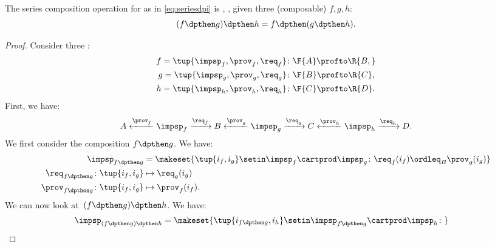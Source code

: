 \begin{lemma}
    \label{lem:dpi-series}
    The series composition operation for  as in \cref{eq:seriesdpi} is , \ie, given three (composable)  $f,g,h$:
    \begin{equation}
        (f\dpthen g)
        \dpthen h = f\dpthen (g\dpthen h).
    \end{equation}
\end{lemma}
\begin{proof}
    Consider three :
    \begin{equation}
        \begin{aligned}
            f=\tup{{\impsp_f, \prov_f, \req_f} } & \colon \F{A} \profto\R{B,} \\
            g=\tup{\impsp_g, \prov_g, \req_g}    & \colon \F{B} \profto \R{C}, \\
            h=\tup{\impsp_h, \prov_h, \req_h}    & \colon \F{C} \profto \R{D}.
        \end{aligned}
    \end{equation}
    First, we have:
    \begin{equation}
        A \xleftarrow{\prov_f} \impsp_f \xrightarrow{\req_f} B
        \xleftarrow{\prov_g} \impsp_g \xrightarrow{\req_g} C
        \xleftarrow{\prov_h} \impsp_h \xrightarrow{\req_h} D.
    \end{equation}
    We first consider the composition $f\dpthen g$.
    We have:
    \begin{equation}
        \begin{aligned}
            \impsp_{f\dpthen g}                     & = \makeset{
                \tup{i_f,i_g} \setin \impsp_f \cartprod \impsp_g \colon
                \req_f(i_f) \ordleq_{B} \prov_g(i_g)
            } \\
            \req_{f\dpthen g} \colon \tup{i_f,i_g}  & \mapsto \req_g(i_g) \\
            \prov_{f\dpthen g} \colon \tup{i_f,i_g} & \mapsto \prov_f(i_f).
        \end{aligned}
    \end{equation}
    We can now look at~$(f\dpthen g)\dpthen h$.
    We have:
    \begin{equation}
        \begin{aligned}
             & \impsp_{(f\dpthen g)\dpthen h} = \makeset{
                \tup{i_{f\dpthen g},i_h} \setin \impsp_{f\dpthen g} \cartprod \impsp_{h}\colon
}
\end{aligned}
\end{equation}
\end{proof}
